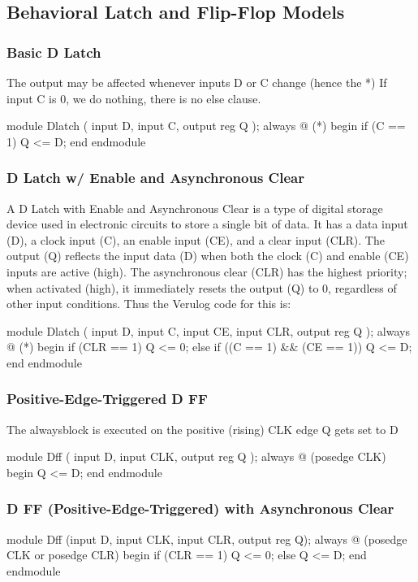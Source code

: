\documentclass[12pt,openany]{book}
\begin{document}
\subsection{Behavioral Latch and
Flip-Flop Models}
\subsubsection{Basic D Latch}
The output may be affected whenever inputs D or C change (hence the *)
If input C is 0, we do nothing, there is no else clause.
\begin{vhdl}
module Dlatch (
	input D,
	input C,
	output reg Q
	);
	always @ (*)
	begin
		if (C == 1)
		Q <= D;
	end
endmodule
\end{vhdl}
\vspace*{5px}
\subsubsection{D Latch w/ Enable and Asynchronous Clear}
A D Latch with Enable and Asynchronous Clear is a type of digital storage device used in electronic circuits to store a single bit of data. It has a data input (D), a clock input (C), an enable input (CE), and a clear input (CLR). The output (Q) reflects the input data (D) when both the clock (C) and enable (CE) inputs are active (high). The asynchronous clear (CLR) has the highest priority; when activated (high), it immediately resets the output (Q) to 0, regardless of other input conditions.
Thus the Verulog code for this is:
\begin{vhdl}
module Dlatch (
	input D,
	input C,
	input CE,
	input CLR,
	output reg Q
	);
	always @ (*)
	begin
		if (CLR == 1)
			Q <= 0;
		else if ((C == 1) && (CE == 1))
			Q <= D;
	end
endmodule
\end{vhdl}

\subsubsection{Positive-Edge-Triggered D FF}
The alwaysblock is executed on the positive (rising) CLK edge Q gets set to D
\begin{vhdl}
module Dff (
input D,
input CLK,
output reg Q
);
	always @ (posedge CLK)
	begin
		Q <= D;
	end
endmodule
\end{vhdl}
\subsubsection{D FF (Positive-Edge-Triggered) with Asynchronous Clear}
\begin{vhdl}
module Dff (input D, input CLK, input CLR, output reg Q);
	always @ (posedge CLK or posedge CLR)
		begin
			if (CLR == 1)
				Q <= 0;
			else
				Q <= D;
		end
endmodule
\end{vhdl}
\end{document}
